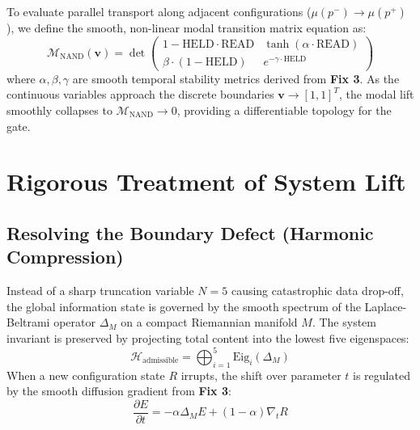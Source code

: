 \documentclass[11pt]{article}
\begin{document}
To evaluate parallel transport along adjacent configurations ($\mu(p^-) \longrightarrow \mu(p^+)$), we define the smooth, non-linear modal transition matrix equation as:
\begin{equation}
\mathcal{M}_{\text{NAND}}(\mathbf{v}) = \det \begin{pmatrix} 1 - \text{HELD} \cdot \text{READ} & \tanh(\alpha \cdot \text{READ}) \\ \beta \cdot (1 - \text{HELD}) & e^{-\gamma \cdot \text{HELD}} \end{pmatrix}
\end{equation}
where $\alpha, \beta, \gamma$ are smooth temporal stability metrics derived from \textbf{Fix 3}. As the continuous variables approach the discrete boundaries $\mathbf{v} \to [1,1]^T$, the modal lift smoothly collapses to $\mathcal{M}_{\text{NAND}} \to 0$, providing a differentiable topology for the gate.

\section{Rigorous Treatment of System Lift}

\subsection{Resolving the Boundary Defect (Harmonic Compression)}
Instead of a sharp truncation variable $N=5$ causing catastrophic data drop-off, the global information state is governed by the smooth spectrum of the Laplace-Beltrami operator $\Delta_M$ on a compact Riemannian manifold $M$. The system invariant is preserved by projecting total content into the lowest five eigenspaces:
\begin{equation}
\mathcal{H}_{\text{admissible}} = \bigoplus_{i=1}^{5} \text{Eig}_i(\Delta_M)
\end{equation}
When a new configuration state $R$ irrupts, the shift over parameter $t$ is regulated by the smooth diffusion gradient from \textbf{Fix 3}:
\begin{equation}
\frac{\partial E}{\partial t} = -\alpha \Delta_M E + (1-\alpha)\nabla_t R
\end{equation}
\end{document}
